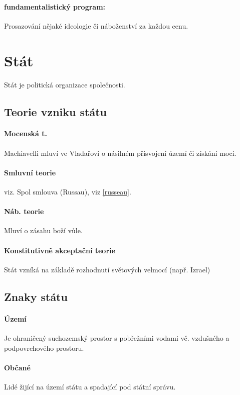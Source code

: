 \documentclass[10pt,a4paper,
twoside,%
]{report}
\begin{document}
\paragraph{fundamentalistický program:} Prosazování nějaké ideologie či náboženství za  každou cenu.

\section{Stát}

Stát je politická organizace společnosti.

\subsection{Teorie vzniku státu}
\paragraph{Mocenská t.} Machiavelli mluví ve Vladařovi o násilném přisvojení území či získání moci.

\paragraph{Smluvní teorie} viz. Spol smlouva (Russau), viz \ref{russeau}.

\paragraph{Náb. teorie} Mluví o zásahu boží vůle.

\paragraph{Konstitutivně akceptační teorie} Stát vzníká na základě rozhodnutí světových velmocí (např. Izrael)

\subsection{Znaky státu}

\paragraph{Území} Je ohraničený suchozemský prostor s pobřežními vodami vč. vzdušného a podpovrchového prostoru.

\paragraph{Občané} Lidé žijící na území státu a spadající pod státní správu.
\end{document}
